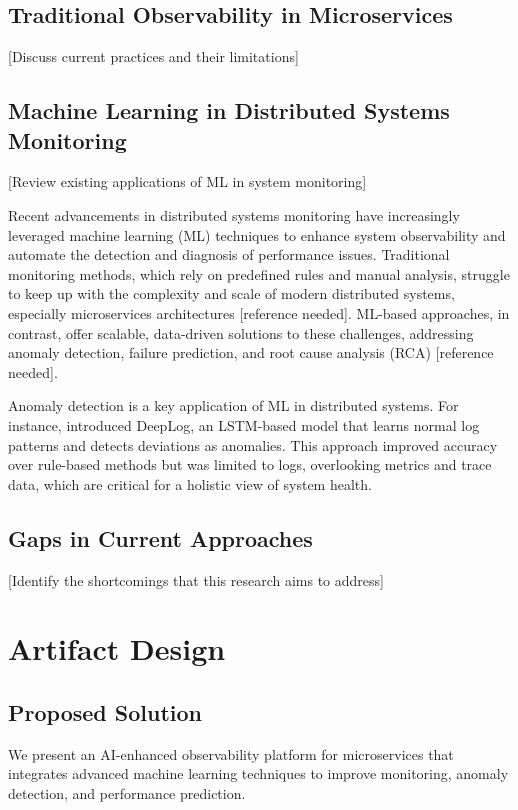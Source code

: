 \documentclass[10pt,journal,compsoc]{IEEEtran}
\begin{document}
\subsection{Traditional Observability in Microservices}
[Discuss current practices and their limitations]

\subsection{Machine Learning in Distributed Systems Monitoring}
[Review existing applications of ML in system monitoring]

Recent advancements in distributed systems monitoring have increasingly leveraged machine learning (ML) techniques to enhance system observability and automate the detection and diagnosis of performance issues. Traditional monitoring methods, which rely on predefined rules and manual analysis, struggle to keep up with the complexity and scale of modern distributed systems, especially microservices architectures [reference needed]. ML-based approaches, in contrast, offer scalable, data-driven solutions to these challenges, addressing anomaly detection, failure prediction, and root cause analysis (RCA) [reference needed].

Anomaly detection is a key application of ML in distributed systems. For instance, \cite{du2017deeplog} introduced DeepLog, an LSTM-based model that learns normal log patterns and detects deviations as anomalies. This approach improved accuracy over rule-based methods but was limited to logs, overlooking metrics and trace data, which are critical for a holistic view of system health.



\subsection{Gaps in Current Approaches}
[Identify the shortcomings that this research aims to address]

\section{Artifact Design}
\subsection{Proposed Solution}
We present an AI-enhanced observability platform for microservices that integrates advanced machine learning techniques to improve monitoring, anomaly detection, and performance prediction.
\end{document}
